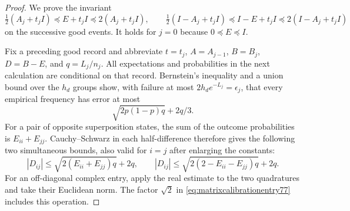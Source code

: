 \begin{proof}
We prove the invariant
\begin{equation}\label{eq:matrixcalibrationinvariant77}
 \tfrac12(A_j+t_jI)\preceq E+t_jI\preceq2(A_j+t_jI),
 \qquad
 \tfrac12(I-A_j+t_jI)\preceq I-E+t_jI
                                      \preceq2(I-A_j+t_jI)
\end{equation}
on the successive good events.  It holds for $j=0$ because
$0\preceq E\preceq I$.

Fix a preceding good record and abbreviate
$t=t_j$, $A=A_{j-1}$, $B=B_j$, $D=B-E$, and $q=L_j/n_j$.
All expectations and probabilities in the next calculation are
conditional on that record.  Bernstein's inequality and a union
bound over the $h_d$ groups show, with failure at most
$2h_de^{-L_j}=\epsilon_j$, that every empirical frequency has error
at most
\[
 \sqrt{2p(1-p)q}+2q/3.
\]
For a pair of opposite superposition states, the sum of the outcome
probabilities is $E_{ii}+E_{jj}$.  Cauchy--Schwarz in each
half-difference therefore gives the following two simultaneous
bounds, also valid for $i=j$ after enlarging the constants:
\begin{equation}\label{eq:matrixcalibrationentry77}
 |D_{ij}|\le\sqrt{2(E_{ii}+E_{jj})q}+2q,
 \qquad
 |D_{ij}|\le\sqrt{2(2-E_{ii}-E_{jj})q}+2q.
\end{equation}
For an off-diagonal complex entry, apply the real estimate to the
two quadratures and take their Euclidean norm.  The factor $\sqrt2$
in \eqref{eq:matrixcalibrationentry77} includes this operation.


\end{proof}
